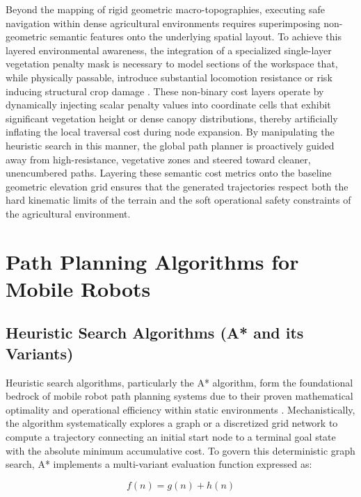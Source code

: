 Beyond the mapping of rigid geometric macro-topographies, executing safe navigation within dense
agricultural environments requires superimposing non-geometric semantic features onto the underlying
spatial layout. To achieve this layered environmental awareness, the integration of a specialized
single-layer vegetation penalty mask is necessary to model sections of the workspace that, while
physically passable, introduce substantial locomotion resistance or risk inducing structural crop
damage \citep{Himmelsbach_2021_enablingoffroad}. These non-binary cost layers operate by dynamically injecting scalar penalty
values into coordinate cells that exhibit significant vegetation height or dense canopy
distributions, thereby artificially inflating the local traversal cost during node expansion. By
manipulating the heuristic search in this manner, the global path planner is proactively guided away
from high-resistance, vegetative zones and steered toward cleaner, unencumbered paths. Layering
these semantic cost metrics onto the baseline geometric elevation grid ensures that the generated
trajectories respect both the hard kinematic limits of the terrain and the soft operational safety
constraints of the agricultural environment.

\section{Path Planning Algorithms for Mobile Robots}

\subsection{Heuristic Search Algorithms (A* and its Variants)}

Heuristic search algorithms, particularly the A* algorithm, form the foundational bedrock of mobile
robot path planning systems due to their proven mathematical optimality and operational efficiency
within static environments \citep{Karur_2021_surveypath, Noto_2000_methodshortest}. Mechanistically, the algorithm systematically
explores a graph or a discretized grid network to compute a trajectory connecting an initial start
node to a terminal goal state with the absolute minimum accumulative cost. To govern this
deterministic graph search, A* implements a multi-variant evaluation function expressed as:

\begin{equation}
    f(n) = g(n) + h(n)
\end{equation}

